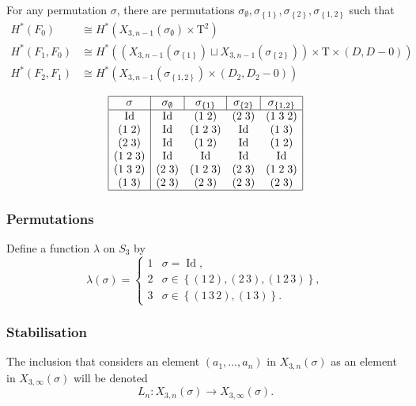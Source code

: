 \documentclass{beamer} %
\DeclareMathOperator{\Id}{Id}
\newcommand{\T}{\mathrm{T}}
\newcommand{\set}[1]{\left\{ #1 \right\}}
\renewcommand{\l}{\lambda}
\begin{document}
\begin{frame}
  \begin{theorem}
    For any permutation $\sigma$, there are permutations
    $\sigma_{\emptyset},\sigma_{\set{1}},\sigma_{\set{2}},\sigma_{\set{1,2}}$
    such that
    \begin{align*}
      H^*(F_0) &\cong H^*(X_{3,n-1}(\sigma_{\emptyset})\times\T^2) \\
      H^*(F_1,F_0) &\cong H^*((X_{3,n-1}(\sigma_{\set{1}})\sqcup
                     X_{3,n-1}(\sigma_{\set{2}}))\times \T\times
                     (D,D-0)) \\
      H^*(F_2,F_1) &\cong
                     H^*(X_{3,n-1}(\sigma_{\set{1,2}})\times(D_2,D_2-0))
    \end{align*}
  \end{theorem} \pause
  \[
  \begin{array}{|c|cccc|}
    \hline
    \sigma & \multicolumn{1}{c|}{\sigma_\emptyset} 
    & \multicolumn{1}{c|}{\sigma_{\set{1}}} 
    & \multicolumn{1}{c|}{\sigma_{\set{2}}} & \sigma_{\set{1,2}} \\
    \hline
    \Id & \Id & (1\;2) & (2\;3) & (1\;3\;2) \\
    (1\;2) & \Id & (1\;2\;3) & \Id & (1\;3) \\
    (2\;3) & \Id & (1\;2) & \Id & (1\;2) \\
    (1\;2\;3) & \Id & \Id & \Id & \Id \\
    (1\;3\;2) & (2\;3) & (1\;2\;3) & (2\;3) & (1\;2\;3) \\
    (1\;3) & (2\; 3) & (2\;3) & (2\;3) & (2\;3) \\
    \hline
  \end{array}
  \]
\end{frame}

\begin{frame}
  \frametitle{Permutations}
  \begin{definition}
    Define a function $\l$ on $S_3$ by
    \[ \l(\sigma) =
    \begin{cases}
      1 & \sigma = \Id, \\
      2 & \sigma \in \set{(1\,2),(2\,3),(1\,2\,3)}, \\
      3 & \sigma \in \set{(1\,3\,2), (1\,3)}.
    \end{cases} \]
  \end{definition}
\end{frame}

\begin{frame}
  \frametitle{Stabilisation}
  \begin{definition}
    The inclusion that considers an element $(a_1,\dots,a_n)$ in
    $X_{3,n}(\sigma)$ as an element in $X_{3,\infty}(\sigma)$ will be
    denoted
    \[ L_n : X_{3,n}(\sigma) \to X_{3,\infty}(\sigma). \]
  \end{definition}
\end{frame}
\end{document}

